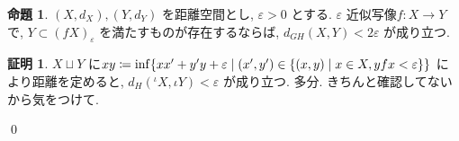 \documentclass[10pt, fleqn, label-section=none]{bxjsarticle}
\theoremstyle{definition}
\newtheorem{prop}[dfn]{命題}
\newtheorem*{pf*}{証明}
\newcommand{\veps}{\varepsilon}
\newcommand{\cbra}[1]{\mleft\{#1\mright\}}
\renewcommand{\;}{\, ; \,}
\begin{document}
\begin{prop}$(X, d_X), (Y, d_Y)$ を距離空間とし, $\veps > 0$ とする. $\veps$ 近似写像$f: X \rightarrow Y$  で, $Y \subset (fX)_\veps $ を満たすものが存在するならば, $d_{GH}(X, Y) < 2\veps$ が成り立つ. 

\end{prop}
\begin{pf*}$X \sqcup Y$ に$xy \coloneqq \inf \cbra{xx^\prime + y^\prime y + \veps \mid (x^\prime, y ^\prime) \in \cbra{(x, y) \mid x \in X, yfx < \veps}}$ により距離を定めると, $d_H(^\iota X, \iota Y) < \veps$ が成り立つ. 多分. きちんと確認してないから気をつけて. 

\qed
\end{pf*}
\end{document}
